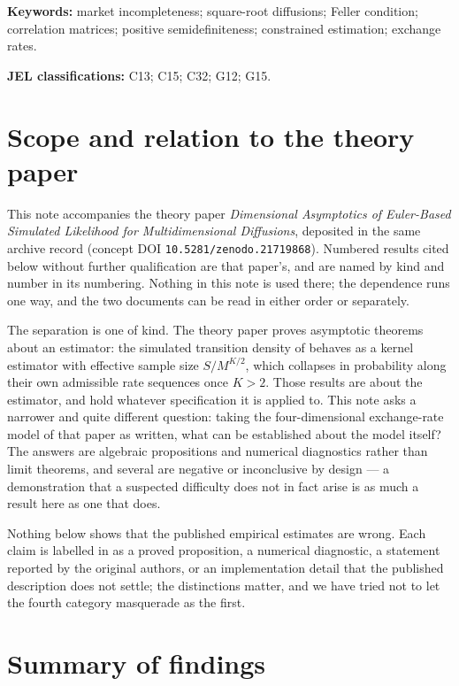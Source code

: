 \documentclass[11pt]{article}
\theoremstyle{definition}
\newcommand{\paperkeywords}{market incompleteness; square-root diffusions; Feller condition; correlation matrices; positive semidefiniteness; constrained estimation; exchange rates}
\begin{document}
\noindent\textbf{Keywords:} \paperkeywords.

\noindent\textbf{JEL classifications:} C13; C15; C32; G12; G15.

\section{Scope and relation to the theory paper}\label{sec:companion_scope}

This note accompanies the theory paper \emph{Dimensional Asymptotics of Euler-Based Simulated Likelihood for Multidimensional Diffusions}, deposited in the same archive record (concept DOI \texttt{10.5281/zenodo.21719868}). Numbered results cited below without further qualification are that paper's, and are named by kind and number in its numbering. Nothing in this note is used there; the dependence runs one way, and the two documents can be read in either order or separately.

The separation is one of kind. The theory paper proves asymptotic theorems about an estimator: the simulated transition density of \citet{BrandtSantaClara2002} behaves as a kernel estimator with effective sample size $S/M^{K/2}$, which collapses in probability along their own admissible rate sequences once $K>2$. Those results are about the estimator, and hold whatever specification it is applied to. This note asks a narrower and quite different question: taking the four-dimensional exchange-rate model of that paper as written, what can be established about the model itself? The answers are algebraic propositions and numerical diagnostics rather than limit theorems, and several are negative or inconclusive by design --- a demonstration that a suspected difficulty does not in fact arise is as much a result here as one that does.

Nothing below shows that the published empirical estimates are wrong. Each claim is labelled in  as a proved proposition, a numerical diagnostic, a statement reported by the original authors, or an implementation detail that the published description does not settle; the distinctions matter, and we have tried not to let the fourth category masquerade as the first.

\section{Summary of findings}\label{sec:application_summary}
\end{document}
